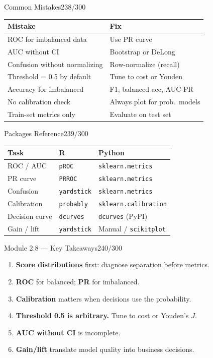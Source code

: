 \documentclass[10pt]{beamer}
\newcommand{\smark}[1]{\hfill{\scriptsize\color{codegray}#1}}
\begin{document}
\begin{frame}{Common Mistakes}\smark{238/300}
\centering\small
\begin{tabular}{@{}ll@{}}
    \toprule
    \textbf{Mistake} & \textbf{Fix} \\
    \midrule
    ROC for imbalanced data          & Use PR curve \\
    AUC without CI                   & Bootstrap or DeLong \\
    Confusion without normalizing    & Row-normalize (recall) \\
    Threshold = 0.5 by default       & Tune to cost or Youden \\
    Accuracy for imbalanced          & F1, balanced acc, AUC-PR \\
    No calibration check             & Always plot for prob.\ models \\
    Train-set metrics only           & Evaluate on test set \\
    \bottomrule
\end{tabular}
\end{frame}

\begin{frame}{Packages Reference}\smark{239/300}
\centering\small
\begin{tabular}{@{}lll@{}}
    \toprule
    \textbf{Task} & \textbf{R} & \textbf{Python} \\
    \midrule
    ROC / AUC      & \texttt{pROC}          & \texttt{sklearn.metrics} \\
    PR curve       & \texttt{PRROC}         & \texttt{sklearn.metrics} \\
    Confusion      & \texttt{yardstick}     & \texttt{sklearn.metrics} \\
    Calibration    & \texttt{probably}      & \texttt{sklearn.calibration} \\
    Decision curve & \texttt{dcurves}       & \texttt{dcurves} (PyPI) \\
    Gain / lift    & \texttt{yardstick}     & Manual / \texttt{scikitplot} \\
    \bottomrule
\end{tabular}
\end{frame}

\begin{frame}{Module 2.8 --- Key Takeaways}\smark{240/300}
\begin{enumerate}
    \item \textbf{Score distributions} first: diagnose separation before metrics.
    \item \textbf{ROC} for balanced; \textbf{PR} for imbalanced.
    \item \textbf{Calibration} matters when decisions use the probability.
    \item \textbf{Threshold 0.5 is arbitrary.} Tune to cost or Youden's $J$.
    \item \textbf{AUC without CI} is incomplete.
    \item \textbf{Gain/lift} translate model quality into business decisions.
\end{enumerate}
\end{frame}
\end{document}
